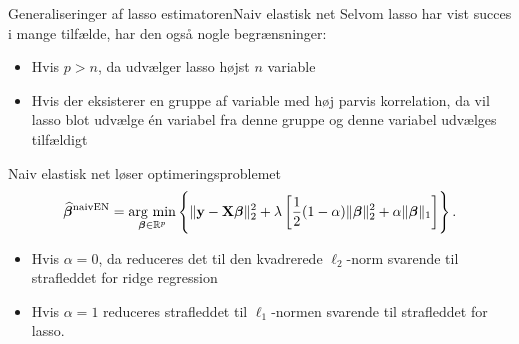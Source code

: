 \begin{frame}{Generaliseringer af lasso estimatoren}{Naiv elastisk net}
Selvom lasso har vist succes i mange tilfælde, har den også nogle begrænsninger:
\begin{itemize}
\item Hvis \(p>n\), da udvælger lasso højst \(n\) variable
\item Hvis der eksisterer en gruppe af variable med høj parvis korrelation, da vil lasso blot udvælge én variabel fra denne gruppe og denne variabel udvælges tilfældigt
\end{itemize}

Naiv elastisk net løser optimeringsproblemet
\begin{align*}
\widehat{\boldsymbol{\beta}}^\text{naivEN} =\argmin_{\boldsymbol{\beta} \in \R^p} \cbr{ \Vert \mathbf{y} - \mathbf{X} \boldsymbol{\beta} \Vert_2^2 + \lambda \sbr{\frac{1}{2}(1- \alpha) \Vert \boldsymbol{\beta} \Vert_2^2 + \alpha \Vert \boldsymbol{\beta} \Vert_1}}. 
\end{align*}
\begin{itemize}
\item Hvis $\alpha=0$, da reduceres det til den kvadrerede $\ell_2$-norm svarende til strafleddet for ridge regression
\item Hvis $\alpha=1$ reduceres strafleddet til $\ell_1$-normen svarende til strafleddet for lasso.
\end{itemize}
\end{frame}

